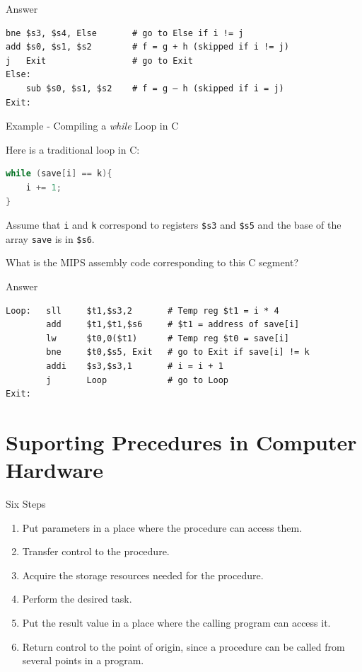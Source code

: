 \begin{frame}[fragile]{Answer}
\begin{lstlisting}[keywords={bne, add, j, sub}, keywordstyle=\color{purple}\textbf]
bne $s3, $s4, Else       # go to Else if i != j
add $s0, $s1, $s2        # f = g + h (skipped if i != j)
j   Exit                 # go to Exit
Else: 
    sub $s0, $s1, $s2    # f = g – h (skipped if i = j)
Exit:
\end{lstlisting}    
\end{frame}

\begin{frame}[fragile]{Example - Compiling a \textit{while} Loop in C}
\begin{flushleft}
Here is a traditional loop in C:
\begin{lstlisting}[language=c, keywordstyle=\color{purple}\textbf]
while (save[i] == k){
    i += 1;
}
\end{lstlisting}

Assume that \texttt{i} and \texttt{k} correspond to registers \texttt{\$s3} and \texttt{\$s5} and the base of the
array \texttt{save} is in \texttt{\$s6}.

What is the MIPS assembly code corresponding to this
C segment?
\end{flushleft}
\end{frame}

\begin{frame}[fragile]{Answer}
\begin{lstlisting}[keywords={sll, add, lw, bne, addi, j}, keywordstyle=\color{purple}\textbf]
Loop:   sll     $t1,$s3,2       # Temp reg $t1 = i * 4
        add     $t1,$t1,$s6     # $t1 = address of save[i]
        lw      $t0,0($t1)      # Temp reg $t0 = save[i]
        bne     $t0,$s5, Exit   # go to Exit if save[i] != k
        addi    $s3,$s3,1       # i = i + 1
        j       Loop            # go to Loop
Exit:
\end{lstlisting}
\end{frame}

\section{Suporting Precedures in Computer Hardware}
\begin{frame}{Six Steps}
\begin{enumerate}
\item Put parameters in a place where the procedure can access them.
\item Transfer control to the procedure.
\item Acquire the storage resources needed for the procedure. 
\item Perform the desired task.
\item Put the result value in a place where the calling program can access it. 
\item Return control to the point of origin, since a procedure can be called from several points in a program.
\end{enumerate}
\end{frame}


